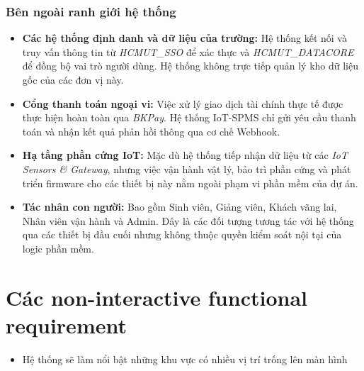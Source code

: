 \documentclass[a4paper,12pt]{article}
\begin{document}
\subsubsection{Bên ngoài ranh giới hệ thống}
\begin{itemize}
    \item \textbf{Các hệ thống định danh và dữ liệu của trường:} Hệ thống kết nối và truy vấn thông tin từ \textit{HCMUT\_SSO} để xác thực và \textit{HCMUT\_DATACORE} để đồng bộ vai trò người dùng. Hệ thống không trực tiếp quản lý kho dữ liệu gốc của các đơn vị này.
    \item \textbf{Cổng thanh toán ngoại vi:} Việc xử lý giao dịch tài chính thực tế được thực hiện hoàn toàn qua \textit{BKPay}. Hệ thống IoT-SPMS chỉ gửi yêu cầu thanh toán và nhận kết quả phản hồi thông qua cơ chế Webhook.
    \item \textbf{Hạ tầng phần cứng IoT:} Mặc dù hệ thống tiếp nhận dữ liệu từ các \textit{IoT Sensors \& Gateway}, nhưng việc vận hành vật lý, bảo trì phần cứng và phát triển firmware cho các thiết bị này nằm ngoài phạm vi phần mềm của dự án.
    \item \textbf{Tác nhân con người:} Bao gồm Sinh viên, Giảng viên, Khách vãng lai, Nhân viên vận hành và Admin. Đây là các đối tượng tương tác với hệ thống qua các thiết bị đầu cuối nhưng không thuộc quyền kiểm soát nội tại của logic phần mềm.
\end{itemize}

\section{Các non-interactive functional requirement}
\begin{itemize}
    \item Hệ thống sẽ làm nổi bật những khu vực có nhiều vị trí trống lên màn hình
\end{itemize} 
\end{document}
